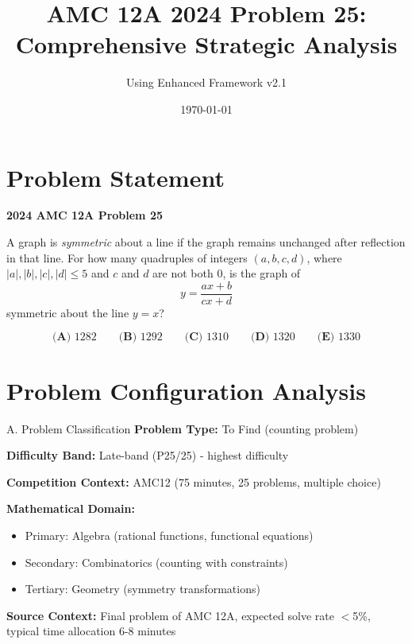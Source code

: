 \documentclass[12pt]{article}
\title{\textbf{AMC 12A 2024 Problem 25:\\Comprehensive Strategic Analysis}}
\author{Using Enhanced Framework v2.1}
\date{\today}
\begin{document}
\maketitle

\tableofcontents
\newpage

\section{Problem Statement}

\textbf{2024 AMC 12A Problem 25}

A graph is \textit{symmetric} about a line if the graph remains unchanged after reflection in that line. For how many quadruples of integers $(a,b,c,d)$, where $|a|,|b|,|c|,|d| \leq 5$ and $c$ and $d$ are not both $0$, is the graph of
\[y = \frac{ax+b}{cx+d}\]
symmetric about the line $y=x$?

\[\textbf{(A) }1282\qquad\textbf{(B) }1292\qquad\textbf{(C) }1310\qquad\textbf{(D) }1320\qquad\textbf{(E) }1330\]

\vspace{0.5cm}

\section{Problem Configuration Analysis}

\begin{configbox}{A. Problem Classification}
\textbf{Problem Type:} To Find (counting problem)

\textbf{Difficulty Band:} Late-band (P25/25) - highest difficulty

\textbf{Competition Context:} AMC12 (75 minutes, 25 problems, multiple choice)

\textbf{Mathematical Domain:} 
\begin{itemize}
    \item Primary: Algebra (rational functions, functional equations)
    \item Secondary: Combinatorics (counting with constraints)
    \item Tertiary: Geometry (symmetry transformations)
\end{itemize}

\textbf{Source Context:} Final problem of AMC 12A, expected solve rate $<$5\%, typical time allocation 6-8 minutes
\end{configbox}
\end{document}
